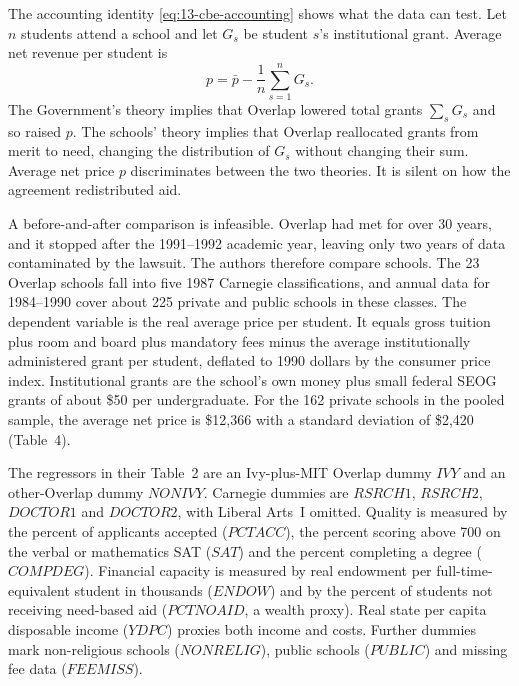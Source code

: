 The accounting identity \eqref{eq:13-cbe-accounting} shows what the data can test. Let $n$ students attend a
school and let $G_s$ be student $s$'s institutional grant. Average net revenue per student is
\begin{equation}\label{eq:13-cbe-avg}
  p = \bar p - \frac{1}{n}\sum_{s=1}^{n} G_s .
\end{equation}
The Government's theory implies that Overlap lowered total grants $\sum_s G_s$ and so raised $p$. The schools'
theory implies that Overlap reallocated grants from merit to need, changing the distribution of $G_s$ without
changing their sum. Average net price $p$ discriminates between the two theories. It is silent on how the
agreement redistributed aid.

A before-and-after comparison is infeasible. Overlap had met for over 30 years, and it stopped after the 1991--1992
academic year, leaving only two years of data contaminated by the lawsuit. The authors therefore compare schools.
The 23 Overlap schools fall into five 1987 Carnegie classifications, and annual data for 1984--1990 cover about 225
private and public schools in these classes. The dependent variable is the real average price per student. It equals gross
tuition plus room and board plus mandatory fees minus the average institutionally administered grant per student,
deflated to 1990 dollars by the consumer price index. Institutional grants are the school's own money plus small
federal SEOG grants of about \$50 per undergraduate. For the 162 private schools in the pooled sample, the average
net price is \$12,366 with a standard deviation of \$2,420 (Table~4).

The regressors in their Table~2 are an Ivy-plus-MIT Overlap dummy $\mathit{IVY}$ and an other-Overlap dummy
$\mathit{NONIVY}$. Carnegie dummies are $\mathit{RSRCH1}$, $\mathit{RSRCH2}$, $\mathit{DOCTOR1}$ and
$\mathit{DOCTOR2}$, with Liberal Arts~I omitted. Quality is measured by the percent of applicants accepted
($\mathit{PCTACC}$), the percent scoring above 700 on the verbal or mathematics SAT ($\mathit{SAT}$) and the
percent completing a degree ($\mathit{COMPDEG}$). Financial capacity is measured by real endowment per
full-time-equivalent student in thousands ($\mathit{ENDOW}$) and by the percent of students not receiving
need-based aid ($\mathit{PCTNOAID}$, a wealth proxy). Real state per capita disposable income ($\mathit{YDPC}$)
proxies both income and costs. Further dummies mark non-religious schools ($\mathit{NONRELIG}$), public schools
($\mathit{PUBLIC}$) and missing fee data ($\mathit{FEEMISS}$).

